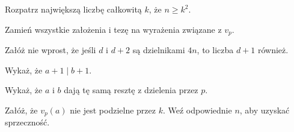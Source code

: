 
\begin{hints_list}
	\item Rozpatrz największą liczbę całkowitą $k$, że $n \geqslant k^2$.
	\item Zamień wszystkie założenia i tezę na wyrażenia związane z $v_p$.
	\item Załóż nie wprost, że jeśli $d$ i $d + 2$ są dzielnikami $4n$, to liczba $d + 1$ również.
	\item Wykaż, że $a + 1 \mid b + 1$.
	\item Wykaż, że $a$ i $b$ dają tę samą resztę z dzielenia przez $p$.
	\item Załóż, że $v_p(a)$ nie jest podzielne przez $k$. Weź odpowiednie $n$, aby uzyskać sprzeczność.
\end{hints_list}
